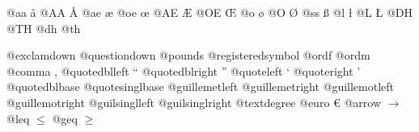 \documentclass{book}
\begin{document}
\begin{titlepage}
@aa \aa{}
@AA \AA{}
@ae \ae{}
@oe \oe{}
@AE \AE{}
@OE \OE{}
@o \o{}
@O \O{}
@ss \ss{}
@l \l{}
@L \L{}
@DH \DH{}
@TH \TH{}
@dh \dh{}
@th \th{}

@exclamdown \textexclamdown{}
@questiondown \textquestiondown{}
@pounds \textsterling{}
@registeredsymbol \circledR{}
@ordf \textordfeminine{}
@ordm \textordmasculine{}
@comma ,
@quotedblleft \textquotedblleft{}
@quotedblright \textquotedblright{}
@quoteleft \textquoteleft{}
@quoteright \textquoteright{}
@quotedblbase \quotedblbase{}
@quotesinglbase \quotesinglbase{}
@guillemetleft \guillemotleft{}
@guillemetright \guillemotright{}
@guillemotleft \guillemotleft{}
@guillemotright \guillemotright{}
@guilsinglleft \guilsinglleft{}
@guilsinglright \guilsinglright{}
@textdegree \textdegree{}
@euro \euro{}
@arrow $\rightarrow{}$
@leq $\leq{}$
@geq $\geq{}$


\end{titlepage}
\end{document}
